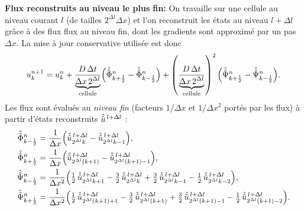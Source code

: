 \textbf{Flux reconstruits au niveau le plus fin: }
On travaille sur une cellule au niveau courant $l$ (de tailles $2^{\Delta l}\Delta x$) et l’on reconstruit les états au niveau $l+\Delta l$ grâce à des flux
flux au niveau fin, dont les gradients sont approximé par un pas $\Delta x$. La mise à jour conservative utilisée est donc
\begin{align}
u_k^{n+1}
= u_k^{n}
+ \frac{D\,\Delta t}{\underbrace{\Delta x\,2^{\Delta l}}_{\text{cellule}}}\Bigl(\hat{\hat{\Phi}}_{k+\frac12}^n-\hat{\hat{\Phi}}_{k-\frac12}^n\Bigr)
+ \left(\frac{D\,\Delta t}{\underbrace{\Delta x\,2^{\Delta l}}_{\text{cellule}}}\right)^2 \Bigl(\hat{\hat{\Psi}}_{k+\frac12}^n-\hat{\hat{\Psi}}_{k-\frac12}^n\Bigr).
\end{align}
Les flux sont évalués au \emph{niveau fin} (facteurs $1/\Delta x$ et $1/\Delta x^2$ portés par les flux) à partir d’états reconstruits $\hat{\hat{u}}^{\,l+\Delta l}$ :
\begin{align}
\hat{\hat{\Phi}}_{k-\frac12}^n
&= \frac{1}{\Delta x}\Bigl(
\hat{\hat{u}}^{\,l+\Delta l}_{2^{\Delta l}k}
-\hat{\hat{u}}^{\,l+\Delta l}_{2^{\Delta l}k-1}\Bigr),\\
\hat{\hat{\Phi}}_{k+\frac12}^n
&= \frac{1}{\Delta x}\Bigl(
\hat{\hat{u}}^{\,l+\Delta l}_{2^{\Delta l}(k+1)}
-\hat{\hat{u}}^{\,l+\Delta l}_{2^{\Delta l}(k+1)-1}\Bigr),\\
\hat{\hat{\Psi}}_{k-\frac12}^n
&= \frac{1}{\Delta x^2}\Bigl(
\tfrac12\,\hat{\hat{u}}^{\,l+\Delta l}_{2^{\Delta l}k+1}
-\tfrac32\,\hat{\hat{u}}^{\,l+\Delta l}_{2^{\Delta l}k}
+\tfrac32\,\hat{\hat{u}}^{\,l+\Delta l}_{2^{\Delta l}k-1}
-\tfrac12\,\hat{\hat{u}}^{\,l+\Delta l}_{2^{\Delta l}k-2}\Bigr),\\
\hat{\hat{\Psi}}_{k+\frac12}^n
&= \frac{1}{\Delta x^2}\Bigl(
\tfrac12\,\hat{\hat{u}}^{\,l+\Delta l}_{2^{\Delta l}(k+1)+1}
-\tfrac32\,\hat{\hat{u}}^{\,l+\Delta l}_{2^{\Delta l}(k+1)}
+\tfrac32\,\hat{\hat{u}}^{\,l+\Delta l}_{2^{\Delta l}(k+1)-1}
-\tfrac12\,\hat{\hat{u}}^{\,l+\Delta l}_{2^{\Delta l}(k+1)-2}\Bigr).
\end{align}


